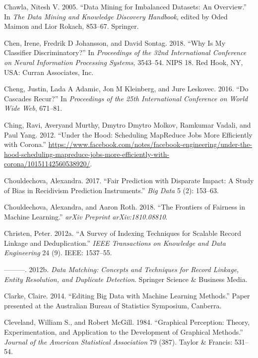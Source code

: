 \documentclass[]{krantz}
\begin{document}
\hypertarget{ref-Chawla05}{}
Chawla, Nitesh V. 2005. ``Data Mining for Imbalanced Datasets: An
Overview.'' In \emph{The Data Mining and Knowledge Discovery Handbook},
edited by Oded Maimon and Lior Rokach, 853--67. Springer.

\hypertarget{ref-chen2018}{}
Chen, Irene, Fredrik D Johansson, and David Sontag. 2018. ``Why Is My
Classifier Discriminatory?'' In \emph{Proceedings of the 32nd
International Conference on Neural Information Processing Systems},
3543--54. NIPS 18. Red Hook, NY, USA: Curran Associates, Inc.

\hypertarget{ref-cheng2016}{}
Cheng, Justin, Lada A Adamic, Jon M Kleinberg, and Jure Leskovec. 2016.
``Do Cascades Recur?'' In \emph{Proceedings of the 25th International
Conference on World Wide Web}, 671--81.

\hypertarget{ref-ching2012}{}
Ching, Ravi, Averyand Murthy, Dmytro Dmytro Molkov, Ramkumar Vadali, and
Paul Yang. 2012. ``Under the Hood: Scheduling MapReduce Jobs More
Efficiently with Corona.''
\url{https://www.facebook.com/notes/facebook-engineering/under-the-hood-scheduling-mapreduce-jobs-more-efficiently-with-corona/10151142560538920/}.

\hypertarget{ref-chouldechova2017}{}
Chouldechova, Alexandra. 2017. ``Fair Prediction with Disparate Impact:
A Study of Bias in Recidivism Prediction Instruments.'' \emph{Big Data}
5 (2): 153--63.

\hypertarget{ref-chouldechova2018}{}
Chouldechova, Alexandra, and Aaron Roth. 2018. ``The Frontiers of
Fairness in Machine Learning.'' \emph{arXiv Preprint arXiv:1810.08810}.

\hypertarget{ref-christen2012survey}{}
Christen, Peter. 2012a. ``A Survey of Indexing Techniques for Scalable
Record Linkage and Deduplication.'' \emph{IEEE Transactions on Knowledge
and Data Engineering} 24 (9). IEEE: 1537--55.

\hypertarget{ref-christen2012data}{}
---------. 2012b. \emph{Data Matching: Concepts and Techniques for
Record Linkage, Entity Resolution, and Duplicate Detection}. Springer
Science \& Business Media.

\hypertarget{ref-Clarke2014}{}
Clarke, Claire. 2014. ``Editing Big Data with Machine Learning
Methods.'' Paper presented at the Australian Bureau of Statistics
Symposium, Canberra.

\hypertarget{ref-cleveland1984graphical}{}
Cleveland, William S., and Robert McGill. 1984. ``Graphical Perception:
Theory, Experimentation, and Application to the Development of Graphical
Methods.'' \emph{Journal of the American Statistical Association} 79
(387). Taylor \& Francis: 531--54.
\end{document}
